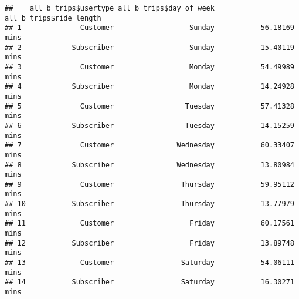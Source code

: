 \documentclass[
]{article}
\newenvironment{Shaded}{\begin{snugshade}}{\end{snugshade}}
\newcommand{\AttributeTok}[1]{\textcolor[rgb]{0.77,0.63,0.00}{#1}}
\newcommand{\CommentTok}[1]{\textcolor[rgb]{0.56,0.35,0.01}{\textit{#1}}}
\newcommand{\FunctionTok}[1]{\textcolor[rgb]{0.00,0.00,0.00}{#1}}
\newcommand{\NormalTok}[1]{#1}
\newcommand{\OtherTok}[1]{\textcolor[rgb]{0.56,0.35,0.01}{#1}}
\newcommand{\SpecialCharTok}[1]{\textcolor[rgb]{0.00,0.00,0.00}{#1}}
\newcommand{\StringTok}[1]{\textcolor[rgb]{0.31,0.60,0.02}{#1}}
\begin{document}
\begin{Shaded}
\end{Shaded}

\begin{verbatim}
##    all_b_trips$usertype all_b_trips$day_of_week all_b_trips$ride_length
## 1              Customer                  Sunday           56.18169 mins
## 2            Subscriber                  Sunday           15.40119 mins
## 3              Customer                  Monday           54.49989 mins
## 4            Subscriber                  Monday           14.24928 mins
## 5              Customer                 Tuesday           57.41328 mins
## 6            Subscriber                 Tuesday           14.15259 mins
## 7              Customer               Wednesday           60.33407 mins
## 8            Subscriber               Wednesday           13.80984 mins
## 9              Customer                Thursday           59.95112 mins
## 10           Subscriber                Thursday           13.77979 mins
## 11             Customer                  Friday           60.17561 mins
## 12           Subscriber                  Friday           13.89748 mins
## 13             Customer                Saturday           54.06111 mins
## 14           Subscriber                Saturday           16.30271 mins
\end{verbatim}
\end{document}
